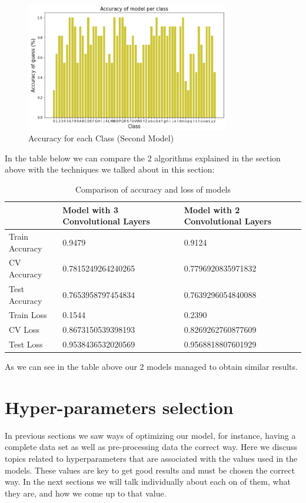 \documentclass[conference]{IEEEtran}
\begin{document}
\begin{figure}[H]
    \centering
    \includegraphics[width=3.5in]{pictures/model2_acc_class.png}
    \caption{Accuracy for each Class (Second Model)}\label{fig:example4}
\end{figure}

In the table below we can compare the 2 algorithms explained in the section above with the techniques we talked about in this section:

\begin{table}[H]
\centering
\caption{Comparison of accuracy and loss of models}
\begin{tabular}{ | m{7em} | m{2.5cm}| m{2.5cm} | } 
\hline
& Model with 3 Convolutional Layers & Model with 2 Convolutional Layers \\ 
\hline
Train Accuracy & 0.9479 & 0.9124 \\
\hline
CV Accuracy & 0.7815249264240265 & 0.7796920835971832 \\
\hline
Test Accuracy & 0.7653958797454834 & 0.7639296054840088 \\
\hline
Train Loss & 0.1544 & 0.2390 \\
\hline
CV Loss & 0.8673150539398193 & 0.8269262760877609 \\
\hline
Test Loss & 0.9538436532020569 & 0.9568818807601929 \\
\hline
\end{tabular}
\end{table}

As we can see in the table above our 2 models managed to obtain similar results.

\section{Hyper-parameters selection}
In previous sections we saw ways of optimizing our model, for instance, having a complete data set as well as pre-processing data the correct way. Here we discuss topics related to hyperparameters that are associated with the values used in the models. These values are key to get good results and must be chosen the correct way. In the next sections we will talk individually about each on of them, what they are, and how we come up to that value. 
\end{document}
